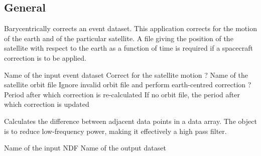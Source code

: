 \newpage

\subsection{General}


\begin{manroutinedescription}

Barycentrically corrects an event dataset. This application corrects
for the motion of the earth and of the particular satellite. A file
giving the position of the satellite with respect to the earth as a 
function of time is required if a spacecraft correction is to be applied.

\begin{manparametertable}
   Name of the input event dataset
   Correct for the satellite motion ?
   Name of the satellite orbit file 
   Ignore invalid orbit file and perform earth-centred correction ?
   Period after which correction is re-calculated
   If no orbit file, the period after which correction is updated
\end{manparametertable}

\end{manroutinedescription}


\begin{manroutinedescription}

Calculates the difference between adjacent data points in a data array.
The object is to reduce low-frequency power, making it effectively a
high pass filter.

\begin{manparametertable}
   Name of the input NDF
   Name of the output dataset
\end{manparametertable}

\end{manroutinedescription}

